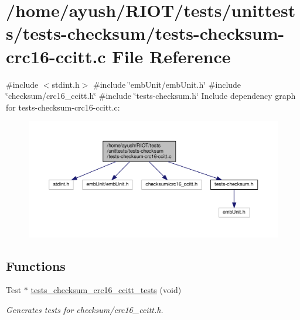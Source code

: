 \hypertarget{tests-checksum-crc16-ccitt_8c}{}\section{/home/ayush/\+R\+I\+O\+T/tests/unittests/tests-\/checksum/tests-\/checksum-\/crc16-\/ccitt.c File Reference}
\label{tests-checksum-crc16-ccitt_8c}
{\ttfamily \#include $<$stdint.\+h$>$}\newline
{\ttfamily \#include \char`\"{}emb\+Unit/emb\+Unit.\+h\char`\"{}}\newline
{\ttfamily \#include \char`\"{}checksum/crc16\+\_\+ccitt.\+h\char`\"{}}\newline
{\ttfamily \#include \char`\"{}tests-\/checksum.\+h\char`\"{}}\newline
Include dependency graph for tests-\/checksum-\/crc16-\/ccitt.c\+:
\nopagebreak
\begin{figure}[H]
\begin{center}
\leavevmode
\includegraphics[width=350pt]{tests-checksum-crc16-ccitt_8c__incl}
\end{center}
\end{figure}
\subsection*{Functions}
\begin{DoxyCompactItemize}
\item 
Test $\ast$ \hyperlink{group__unittests_gab14760f94862d361e37621a414849ac6}{tests\+\_\+checksum\+\_\+crc16\+\_\+ccitt\+\_\+tests} (void)
\begin{DoxyCompactList}\small\item\em Generates tests for checksum/crc16\+\_\+ccitt.\+h. \end{DoxyCompactList}\end{DoxyCompactItemize}
